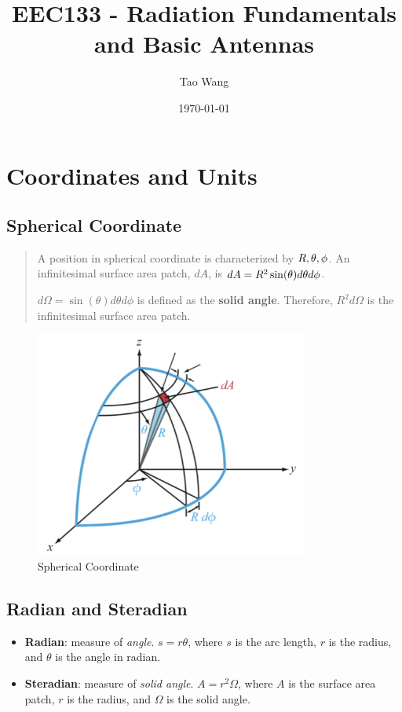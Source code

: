 \documentclass{article} %
\begin{document}
\title{EEC133 - Radiation Fundamentals and Basic Antennas}
\author{Tao Wang}
\date{\today}

\maketitle
\tableofcontents
\pagebreak

\section{Coordinates and Units}
\subsection{Spherical Coordinate}
\begin{quote}
    A position in spherical coordinate is characterized by $R, \space \theta, \space \phi$.
    An infinitesimal surface area patch, $dA$, is $dA = R^2 \sin(\theta) \space d\theta d\phi$.
    \smallskip

    $d\Omega = \sin(\theta) d\theta d\phi$ is defined as the \textbf{solid angle}.
    Therefore, $R^2 d\Omega$ is the infinitesimal surface area patch.
\end{quote}
\begin{figure}[H]
    \centering
    \includegraphics[width=0.8\textwidth]{./image/figure1.png}
    \caption{Spherical Coordinate}
\end{figure}

\subsection{Radian and Steradian}
\begin{itemize}
    \item \textbf{Radian}: measure of \textit{angle}. $s = r \theta$, where $s$ is the arc length, $r$ is the radius, and $\theta$ is the angle in radian.
    \item \textbf{Steradian}: measure of \textit{solid angle}. $A = r^2 \Omega$, where $A$ is the surface area patch, $r$ is the radius, and $\Omega$ is the solid angle.
\end{itemize}
\end{document}
